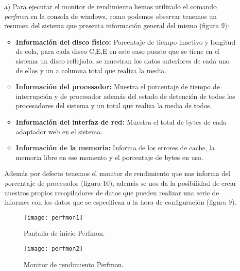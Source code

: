 \documentclass[a4paper, 10pt]{article} %
\begin{document}
 \begin{itemize}
 \item[a)] Para ejecutar el monitor de rendimiento hemos utilizado el comando \textit{perfmon} en la consola de windows, como podemos observar tenemos un resumen del sistema que presenta información general del mismo (figura 9):
 \begin{itemize}
 \item \textbf{Información del disco físico:} Porcentaje de tiempo inactivo y longitud de cola, para cada disco C,E,E en este caso puesto que se tiene en el sistema un disco reflejado, se muestran los datos anteriores de cada uno de ellos y un a columna total que realiza la media.
 \item \textbf{Información del procesador:} Muestra el porcentaje de tiempo de interrupción y de procesador además del estado de detención de todos los procesadores del sistema y un total que realiza la media de todos.
 \item \textbf{Información del interfaz de red:} Muestra el total de bytes de cada adaptador web en el sistema.
 \item \textbf{Información de la memoria:} Informa de los errores de cache, la memoria libre en ese momento y el porcentaje de bytes en uso.
 \end{itemize}
 Además por defecto tenemos el monitor de rendimiento que nos informa del porcentaje de procesador (figura 10), además se nos da la posibilidad de crear nuestros propios recopiladores de datos que pueden realizar una serie de informes con los datos que se especifican a la hora de configuración (figura 9).
 \begin{figure}[H]
\centering 
\texttt{[image: perfmon1]} 
\caption{Pantalla de inicio Perfmon.} 
\label{contexto:figura} 
\end{figure}
\begin{figure}[H]
\centering 
\texttt{[image: perfmon2]} 
\caption{Monitor de rendimiento Perfmon.} 
\label{contexto:figura} 
\end{figure}


\end{itemize}
\end{document}
